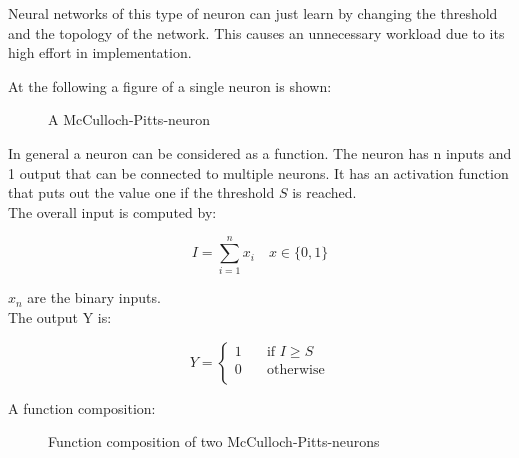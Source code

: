 \documentclass[10pt,a4paper,DIV=11]{scrreprt}
\begin{document}
Neural networks of this type of neuron can just learn by changing the threshold and the topology of the network. This causes an unnecessary workload due to its high effort in implementation.

At the following a figure of a single neuron is shown:

\begin{figure}[H]  %
	\centering
	\caption{A McCulloch-Pitts-neuron}
	\label{fig:pitts1}
\end{figure}

In general a neuron can be considered as a function.
The neuron has n inputs and 1 output that can be connected to multiple neurons. It has an activation function that puts out the value one if the threshold $S$ is reached. \\

The overall input is computed by:

\begin{equation}
I = \sum_{i=1}^{n} x_{i} \quad  x \in \{0, 1\}
\end{equation}

$x_{n}$ are the binary inputs. \\

The output Y is:


\[ Y =
\begin{cases}
1       & \quad \text{if } I  \geq S \\
0  & \quad \text{otherwise}\\
\end{cases}
\]





A function composition:

\begin{figure}[H]
	\centering
	\caption{Function composition of two McCulloch-Pitts-neurons}
	\label{fig:pitts2}
\end{figure}
\end{document}
